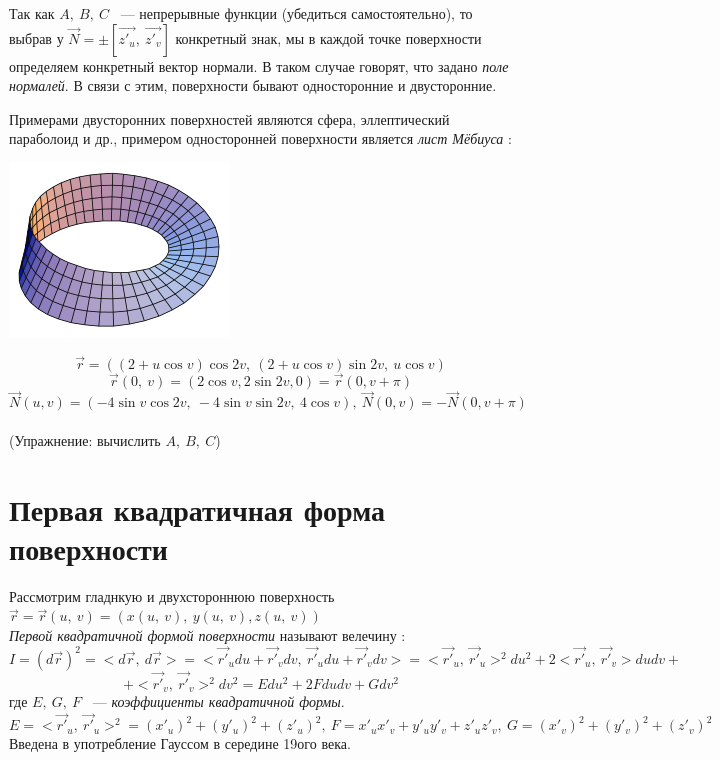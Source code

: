 \documentclass[../../main.tex]{subfiles}
\begin{document}
Так как $A, \ B, \ C$ ~--- непрерывные функции (убедиться самостоятельно), то выбрав у $\vec{N} = \pm\left[ \vec{z'_u}, \ \vec{z'_v}\right]$ конкретный знак, мы в каждой точке поверхности определяем конкретный вектор нормали. В таком случае говорят, что задано \emph{поле нормалей}. В связи с этим, поверхности бывают односторонние и двусторонние.

Примерами двусторонних поверхностей являются сфера, эллептический параболоид и др., примером односторонней поверхности является \emph{лист Мёбиуса} : \\

\begin{center}
\includegraphics[scale = 0.5]{lec22_0.png}
\end{center}

\[\vec{r} = ((2 + u\cos v)\cos2v, \ (2 + u\cos v)\sin2v, \ u\cos v)\]
\[\vec{r}(0, \ v) = (2\cos v, 2\sin2v, 0) = \vec{r}(0, v + \pi)\]
\[\vec{N}(u, v) = (-4\sin v\cos2v, \ -4\sin v\sin2v, \ 4\cos v), \ \vec{N}(0, v) = -\vec{N}(0, v + \pi)\]\\
(Упражнение: вычислить $A, \ B, \ C$)
\section{Первая квадратичная форма поверхности}

Рассмотрим гладнкую и двухстороннюю поверхность $\vec{r} = \vec{r}(u, \ v) = (x(u, \ v), \ y(u, \ v), z(u, \ v))$\\

 \emph{Первой квадратичной формой поверхности} называют велечину : 
 \[I = (d\vec{r})^2 = <d\vec{r}, \ d\vec{r}> = <\vec{r'}_udu + \vec{r'}_vdv, \ \vec{r'}_udu + \vec{r'}_vdv> = <\vec{r'}_u, \ \vec{r'}_u>^2du^2 + 2<\vec{r'}_u, \ \vec{r'}_v>dudv + \] \[ + <\vec{r'}_v, \ \vec{r'}_v>^2dv^2 = Edu^2 + 2Fdudv + Gdv^2\]
 где $E, \ G, \ F$ ~--- \emph{коэффициенты квадратичной формы}.\\
\[E = <\vec{r'}_u, \ \vec{r'}_u>^2 = (x'_u)^2 + (y'_u)^2 + (z'_u)^2, \ 
F = x'_ux'_v + y'_uy'_v + z'_uz'_v, \ G = (x'_v)^2 + (y'_v)^2 + (z'_v)^2\]
Введена в употребление Гауссом в середине 19ого века.
\end{document}
